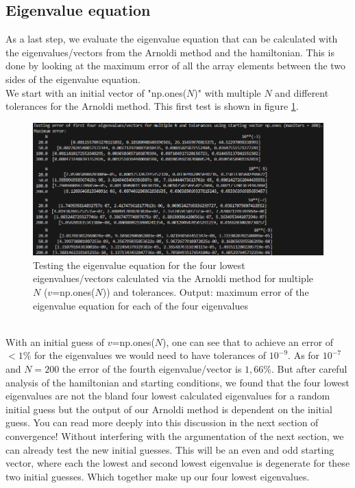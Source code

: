 \documentclass[11pt, letterpaper, onecolumn]{article}
\begin{document}
	\subsection{Eigenvalue equation}
	As a last step, we evaluate the eigenvalue equation that can be calculated with the eigenvalues/vectors from the Arnoldi method and the hamiltonian. This is done by looking at the maximum error of all the array elements between the two sides of the eigenvalue equation.\\
	We start with an initial vector of "np.ones($N$)" with multiple $N$ and different tolerances for the Arnoldi method. This first test is shown in figure \ref{fig:test_eigen_ones}.
	\begin{figure} [h] 
	\begin{center}	
	\includegraphics[width=19cm]{"test_eigen.png"}
	\caption{Testing the eigenvalue equation for the four lowest eigenvalues/vectors calculated via the Arnoldi method for multiple $N$ ($v$=np.ones($N$)) and tolerances. Output: maximum error of the eigenvalue equation for each of the four eigenvalues} \label{fig:test_eigen_ones}
	\end{center}
	\end{figure}
	\\
	With an initial guess of $v$=np.ones($N$), one can see that to achieve an error of $<1\%$ for the eigenvalues we would need to have tolerances of $10^{-9}$. As for $10^{-7}$ and $N=200$ the error of the fourth eigenvalue/vector is $1,66\%$. But after careful analysis of the hamiltonian and starting conditions, we found that the four lowest eigenvalues are not the bland four lowest calculated eigenvalues for a random initial guess but the output of our Arnoldi method is dependent on the initial guess. You can read more deeply into this discussion in the next section of convergence! Without interfering with the argumentation of the next section, we can already test the new initial guesses. This will be an even and odd starting vector, where each the lowest and second lowest eigenvalue is degenerate for these two initial guesses. Which together make up our four lowest eigenvalues.\\
\end{document}
